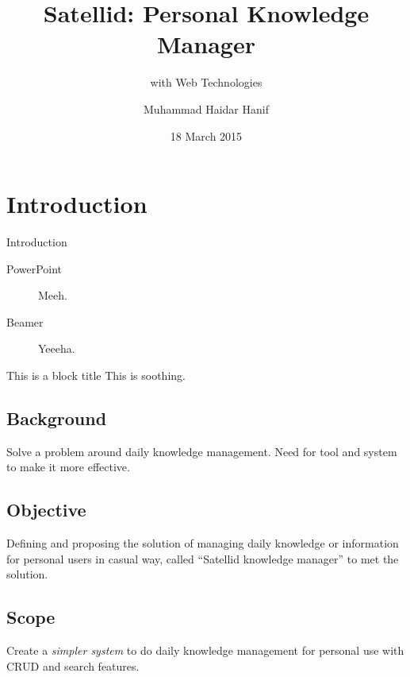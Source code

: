 \documentclass[10pt, compress]{beamer}
\title{Satellid: Personal Knowledge Manager}
\subtitle{with Web Technologies}
\date{18 March 2015}
\author{Muhammad Haidar Hanif}
\institute{Gunadarma University}
\begin{document}

\maketitle


\section{Introduction}


\begin{frame}{Introduction}

  \begin{description}
    \item[PowerPoint] Meeh.
    \item[Beamer] Yeeeha.
  \end{description}

  \begin{block}{This is a block title}
    This is soothing.
  \end{block}

  \subsection{Background}
  Solve a problem around daily knowledge management.
  Need for tool and system to make it more effective.

  \subsection{Objective}
  Defining and proposing the solution of managing daily knowledge or information for personal users in casual way, called ``Satellid knowledge manager'' to met the solution.
  
  \subsection{Scope}
  Create a \emph{simpler system} to do daily knowledge management for personal use with \textsc{CRUD} and search features.

\end{frame}

\end{document}

